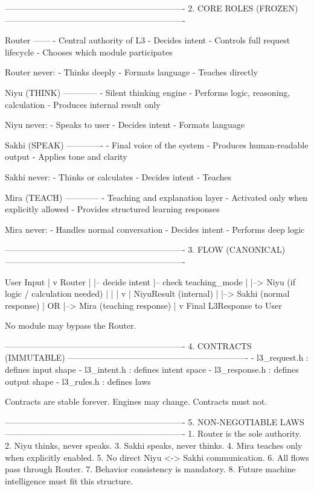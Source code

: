 \documentclass{article}
\begin{document}
----------------------------------------------------------------
2. CORE ROLES (FROZEN)
----------------------------------------------------------------

Router
------
- Central authority of L3
- Decides intent
- Controls full request lifecycle
- Chooses which module participates

Router never:
- Thinks deeply
- Formats language
- Teaches directly

Niyu (THINK)
------------
- Silent thinking engine
- Performs logic, reasoning, calculation
- Produces internal result only

Niyu never:
- Speaks to user
- Decides intent
- Formats language

Sakhi (SPEAK)
-------------
- Final voice of the system
- Produces human-readable output
- Applies tone and clarity

Sakhi never:
- Thinks or calculates
- Decides intent
- Teaches

Mira (TEACH)
------------
- Teaching and explanation layer
- Activated only when explicitly allowed
- Provides structured learning responses

Mira never:
- Handles normal conversation
- Decides intent
- Performs deep logic

----------------------------------------------------------------
3. FLOW (CANONICAL)
----------------------------------------------------------------

User Input
   |
   v
Router
   |
   |-- decide intent
   |-- check teaching_mode
   |
   |--> Niyu (if logic / calculation needed)
   |        |
   |        v
   |   NiyuResult (internal)
   |
   |--> Sakhi (normal response)
   |        OR
   |--> Mira  (teaching response)
   |
   v
Final L3Response to User

No module may bypass the Router.

----------------------------------------------------------------
4. CONTRACTS (IMMUTABLE)
----------------------------------------------------------------
- l3_request.h  : defines input shape
- l3_intent.h   : defines intent space
- l3_response.h : defines output shape
- l3_rules.h    : defines laws

Contracts are stable forever.
Engines may change. Contracts must not.

----------------------------------------------------------------
5. NON-NEGOTIABLE LAWS
----------------------------------------------------------------
1. Router is the sole authority.
2. Niyu thinks, never speaks.
3. Sakhi speaks, never thinks.
4. Mira teaches only when explicitly enabled.
5. No direct Niyu <-> Sakhi communication.
6. All flows pass through Router.
7. Behavior consistency is mandatory.
8. Future machine intelligence must fit this structure.
\end{document}
